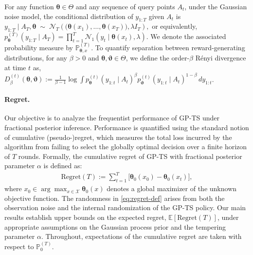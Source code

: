 \documentclass[final,12pt]{colt2026} %
\begin{document}
For any function $\pmb\theta \in \Theta$ and any sequence of query points
$A_t$, under the Gaussian noise model, the conditional distribution of $y_{1:T}$
given $A_t$ is
\(
y_{1:T} \mid A_T, \pmb\theta
\;\sim\;
\mathcal{N}_T\!\left(
\big(\pmb\theta(x_1),\ldots,\pmb\theta(x_T)\big),
\lambda I_T
\right),
\)
or equivalently,
\(
p_{\pmb\theta}^{(T)}(y_{1:T} \mid A_T)
=
\prod_{t=1}^{T} \mathcal{N}_1\!\left(y_t \mid \pmb\theta(x_t), \lambda\right).
\)
We denote the associated probability measure by $\mathbb{P}_{\pmb\theta,x}^{(T)}$. To quantify separation between reward-generating distributions, for any
$\beta > 0$ and $\pmb\theta,\pmb\vartheta \in \Theta$, we define the
order-$\beta$ R\'enyi divergence at time $t$ as,
\(
D_{\beta}^{(t)}(\pmb\theta,\pmb\vartheta)
:=
\frac{1}{\beta-1}
\log
\int
p_{\pmb\theta}^{(t)}(y_{1:t} \mid A_t)^{\beta}
p_{\pmb\vartheta}^{(t)}(y_{1:t} \mid A_t)^{1-\beta}
\, dy_{1:t}
\). 
\paragraph{Regret.} Our objective is to analyze the frequentist performance of GP-TS under fractional posterior inference. Performance is quantified using the standard notion of cumulative (pseudo-)regret, which measures the total loss incurred by the algorithm from failing to select the globally optimal decision over a finite horizon of $T$ rounds. Formally, the cumulative regret of GP-TS with fractional posterior parameter $\alpha$ is defined as:
\begin{align}
\label{eq:regret-def}
\mathrm{Regret}(T)
:= \sum_{t=1}^{T} \bigl[ \pmb\theta_0(x_0) - \pmb\theta_0(x_t) \bigr],
\end{align}
where $x_0 \in \arg\max_{x \in \mathcal{X}} \pmb\theta_0(x)$ denotes a global maximizer of the unknown objective function. The randomness in \eqref{eq:regret-def} arises from both the observation noise and the internal randomization of the GP-TS policy. Our main results establish upper bounds on the expected regret, $\mathbb{E}[\mathrm{Regret}(T)]$, under appropriate assumptions on the Gaussian process prior and the tempering parameter $\alpha$. Throughout, expectations of the cumulative regret are taken with respect to $\mathbb{P}_0^{(T)}$.
\end{document}
